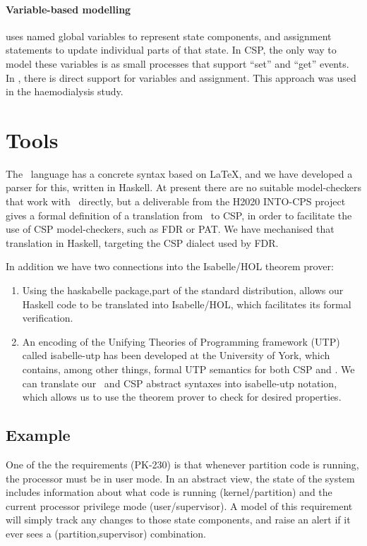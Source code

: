 \paragraph{Variable-based modelling} uses named global variables
to represent state components,
and assignment statements to update individual parts of that state.
In CSP, the only way to model these variables is as small processes
that support ``set'' and ``get'' events.
In \Circus, there is direct support for variables and assignment.
This approach was used in the haemodialysis study\cite{DBLP:conf/asm/GomesB16}.


\section{Tools}

The \Circus\ language has a concrete syntax based on \LaTeX,
and we have developed a parser for this, written in Haskell.
At present there are no suitable model-checkers
that work with \Circus\ directly,
but a deliverable from the H2020 INTO-CPS project\cite{compassd241}
gives a formal definition
of a translation from \Circus\ to CSP,
in order to facilitate the use of CSP model-checkers,
such as FDR\cite{FDR3} or PAT\cite{SunLDP09}.
We have mechanised that translation in Haskell,
targeting the CSP dialect used by FDR.

In addition we have two connections into
the Isabelle/HOL theorem prover:
\begin{enumerate}
  \item
    Using the \textsf{haskabelle} package,part of the standard distribution,
    allows our Haskell code to be translated into Isabelle/HOL,
    which facilitates its formal verification.
  \item
    An encoding of
    the Unifying Theories of Programming framework (UTP)
    called \textsf{isabelle-utp} has been developed
    at the University of York\cite{FosterZW14},
    which contains, among other things, formal UTP semantics for both CSP and
    \Circus.
    We can translate our \Circus\ and CSP abstract syntaxes into
    \textsf{isabelle-utp} notation,
    which allows us to use the theorem prover to check for desired properties.
\end{enumerate}

\subsection{Example}

One of the the requirements (PK-230) is that whenever partition code is running,
the processor must be in user mode.
In an abstract view,
the state of the system includes information about
what code is running (kernel/partition)
and the current processor privilege mode (user/supervisor).
A model of this requirement will simply track any changes
to those state components,
and raise an alert if it ever sees a (partition,supervisor) combination.

